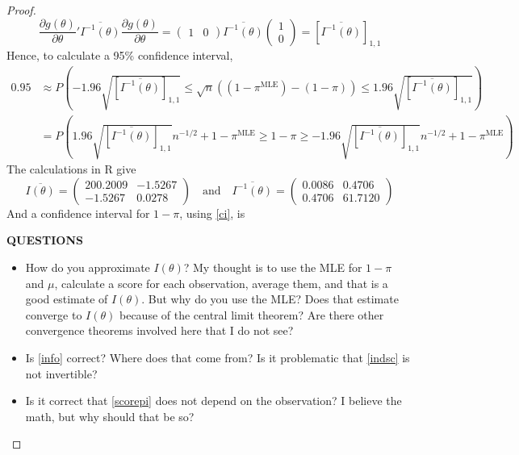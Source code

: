 \documentclass[letterpaper, 12pt]{article}
\begin{document}
\begin{enumerate}
\begin{enumerate}
\begin{proof}
\begin{equation}
\frac{\partial g(\theta) }{\partial \theta}' \overline{I^{-1}(\theta)} \frac{\partial g(\theta) }{\partial \theta}
=
\begin{pmatrix}
1 & 0
\end{pmatrix}
\overline{I^{-1}(\theta)}
\begin{pmatrix}
1 \\ 0
\end{pmatrix}
=
[\overline{I^{-1}(\theta)}]_{1,1}
\end{equation}
Hence, to calculate a 95\% confidence interval, 
\begin{align}
0.95 &\approx P(
-1.96\sqrt{[\overline{I^{-1}(\theta)}]_{1,1}} 
\leq 
\sqrt{n} ((1 - \pi^{\text{MLE}}) - (1 - \pi))
\leq 
1.96\sqrt{[\overline{I^{-1}(\theta)}]_{1,1}}
) \\
&=
P(
1.96\sqrt{[\overline{I^{-1}(\theta)}]_{1,1}}n^{-1/2} + 1 - \pi^{\text{MLE}}
\geq
1-\pi
\geq
-1.96\sqrt{[\overline{I^{-1}(\theta)}]_{1,1}}n^{-1/2} + 1 - \pi^{\text{MLE}}
)
\label{ci}
\end{align}
The calculations in R give
\begin{equation}
\overline{I(\theta)} =
\begin{pmatrix}
200.2009 & -1.5267 \\
-1.5267 & 0.0278
\end{pmatrix}
\quad \text{and}
\quad
\overline{I^{-1}(\theta)}
=
\begin{pmatrix}
0.0086 & 0.4706 \\
0.4706 & 61.7120
\end{pmatrix}
\end{equation}
And a confidence interval for $1 - \pi$, using \eqref{ci}, is
\begin{equation}
[0.0639,0.0675]
\end{equation}


\textbf{QUESTIONS}
\begin{itemize}
\item
How do you approximate $I(\theta)$? My thought is to use the MLE for $1-\pi$ and $\mu$, calculate a score for each observation, average them, and that is a good estimate of $I(\theta)$. But why do you use the MLE? Does that estimate converge to $I(\theta)$ because of the central limit theorem? Are there other convergence theorems involved here that I do not see?
\item
Is \eqref{info} correct? Where does that come from? Is it problematic that \eqref{indsc} is not invertible?
\item
Is it correct that \eqref{scorepi} does not depend on the observation? I believe the math, but why should that be so?
\end{itemize}
\end{proof}
\end{enumerate}


\end{enumerate}
\end{document}
